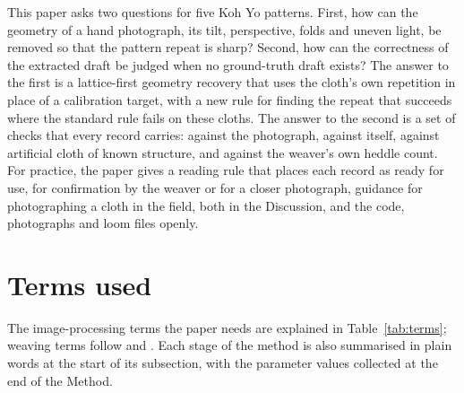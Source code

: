 \documentclass[12pt]{article}
\begin{document}
This paper asks two questions for five Koh Yo patterns. First, how can the geometry of a hand photograph, its tilt, perspective, folds and uneven light, be removed so that the pattern repeat is sharp? Second, how can the correctness of the extracted draft be judged when no ground-truth draft exists? The answer to the first is a lattice-first geometry recovery that uses the cloth's own repetition in place of a calibration target, with a new rule for finding the repeat that succeeds where the standard rule fails on these cloths. The answer to the second is a set of checks that every record carries: against the photograph, against itself, against artificial cloth of known structure, and against the weaver's own heddle count. For practice, the paper gives a reading rule that places each record as ready for use, for confirmation by the weaver or for a closer photograph, guidance for photographing a cloth in the field, both in the Discussion, and the code, photographs and loom files openly.

\section{Terms used}

The image-processing terms the paper needs are explained in Table~\ref{tab:terms}; weaving terms follow \citet{emery1980} and \citet{burnham1980}. Each stage of the method is also summarised in plain words at the start of its subsection, with the parameter values collected at the end of the Method.
\end{document}
